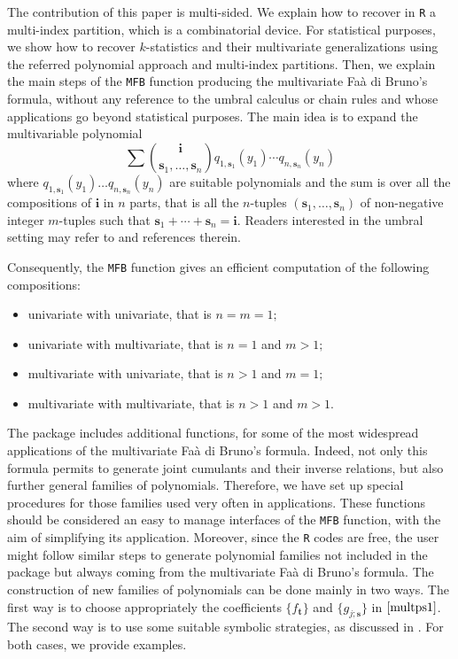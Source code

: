 The contribution of this paper is multi-sided. We explain how to recover
in \texttt{R} a multi-index partition, which is a combinatorial device.
For statistical purposes, we show how to recover \(k\)-statistics and
their multivariate generalizations using the referred polynomial
approach and multi-index partitions. Then, we explain the main steps of
the \texttt{MFB} function producing the multivariate Faà di Bruno's
formula, without any reference to the umbral calculus or chain rules and
whose applications go beyond statistical purposes. The main idea is to
expand the multivariable polynomial \[ 
\sum {\boldsymbol{i} \choose \boldsymbol{s}_1,\ldots,\boldsymbol{s}_n} q_{1,\boldsymbol{s}_1}(y_1) \cdots q_{n,\boldsymbol{s}_n}(y_n)
\] where
\(q_{1,\boldsymbol{s}_1}(y_1) \ldots q_{n,\boldsymbol{s}_n}(y_n)\) are
suitable polynomials and the sum is over all the compositions of
\(\boldsymbol{i}\) in \(n\) parts, that is all the \(n\)-tuples
\((\boldsymbol{s}_1,\ldots,\boldsymbol{s}_n)\) of non-negative integer
\(m\)-tuples such that
\(\boldsymbol{s}_1 + \cdots + \boldsymbol{s}_n = \boldsymbol{i}.\)
Readers interested in the umbral setting may refer to \citet{MR3437172}
and references therein.

Consequently, the \texttt{MFB} function gives an efficient computation
of the following compositions:

\begin{itemize}
\item
  univariate with univariate, that is \(n=m=1;\)
\item
  univariate with multivariate, that is \(n=1\) and \(m >1;\)
\item
  multivariate with univariate, that is \(n >1\) and \(m=1;\)
\item
  multivariate with multivariate, that is \(n >1\) and \(m>1.\)
\end{itemize}

The  package includes additional functions, for
some of the most widespread applications of the multivariate Faà di
Bruno's formula. Indeed, not only this formula permits to generate joint
cumulants and their inverse relations, but also further general families
of polynomials. Therefore, we have set up special procedures for those
families used very often in applications. These functions should be
considered an easy to manage interfaces of the \texttt{MFB} function,
with the aim of simplifying its application. Moreover, since the
\texttt{R} codes are free, the user might follow similar steps to
generate polynomial families not included in the package but always
coming from the multivariate Faà di Bruno's formula. The construction of
new families of polynomials can be done mainly in two ways. The first
way is to choose appropriately the coefficients
\(\{f_{\boldsymbol{t}}\}\) and \(\{g_{j; \boldsymbol{s}}\}\) in
\(\eqref{multps1}\). The second way is to use some suitable symbolic
strategies, as discussed in \citet{MR3437172}. For both cases, we
provide examples.

